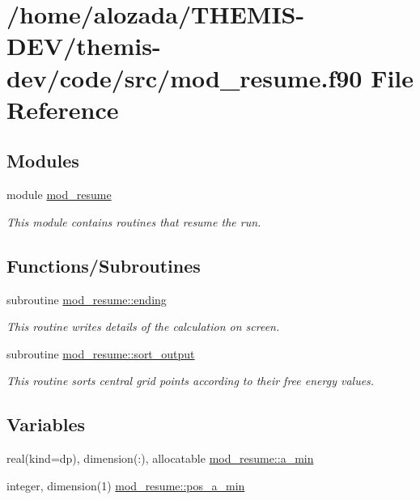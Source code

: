 \hypertarget{mod__resume_8f90}{}\section{/home/alozada/\+T\+H\+E\+M\+I\+S-\/\+D\+E\+V/themis-\/dev/code/src/mod\+\_\+resume.f90 File Reference}
\label{mod__resume_8f90}
\subsection*{Modules}
\begin{DoxyCompactItemize}
\item 
module \hyperlink{namespacemod__resume}{mod\+\_\+resume}
\begin{DoxyCompactList}\small\item\em This module contains routines that resume the run. \end{DoxyCompactList}\end{DoxyCompactItemize}
\subsection*{Functions/\+Subroutines}
\begin{DoxyCompactItemize}
\item 
subroutine \hyperlink{namespacemod__resume_a8b68b1d2c65fcac89fc9f40e0a028dd0}{mod\+\_\+resume\+::ending}
\begin{DoxyCompactList}\small\item\em This routine writes details of the calculation on screen. \end{DoxyCompactList}\item 
subroutine \hyperlink{namespacemod__resume_a36133bfde88e19b38e5d5245c89843fe}{mod\+\_\+resume\+::sort\+\_\+output}
\begin{DoxyCompactList}\small\item\em This routine sorts central grid points according to their free energy values. \end{DoxyCompactList}\end{DoxyCompactItemize}
\subsection*{Variables}
\begin{DoxyCompactItemize}
\item 
real(kind=dp), dimension(\+:), allocatable \hyperlink{namespacemod__resume_ad3cf0f0162ccc00d0efebb0348fe6ae5}{mod\+\_\+resume\+::a\+\_\+min}
\item 
integer, dimension(1) \hyperlink{namespacemod__resume_a2861e2f353be05850b4ad384446859c6}{mod\+\_\+resume\+::pos\+\_\+a\+\_\+min}
\end{DoxyCompactItemize}
